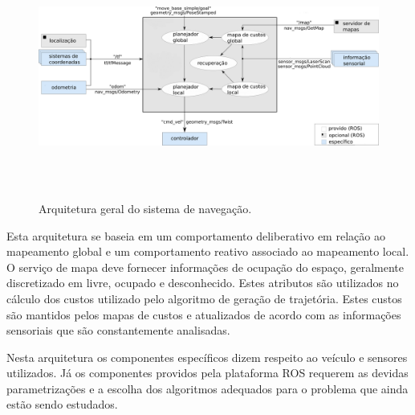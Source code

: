 



\begin{figure}[!h]
  	\centering
	    \includegraphics[width=\textwidth,height=8cm]{images/overview_tf_pt.png}
	 	\caption{Arquitetura geral do sistema de navegação.}
	 	\label{fig:arq}
\end{figure}

Esta arquitetura se baseia em um comportamento deliberativo em relação ao
mapeamento global e um comportamento reativo associado ao mapeamento local. O
serviço de mapa deve fornecer informações de ocupação do espaço, geralmente
discretizado em livre, ocupado e desconhecido. Estes atributos são utilizados no
cálculo dos custos utilizado pelo algoritmo de geração de trajetória. Estes
custos são mantidos pelos mapas de custos e atualizados de acordo com as
informações sensoriais que são constantemente analisadas. 

Nesta arquitetura os componentes específicos dizem respeito ao veículo
e sensores utilizados. Já os componentes providos pela plataforma ROS requerem
as devidas parametrizações e a escolha dos algoritmos adequados para o problema
que ainda estão sendo estudados.

